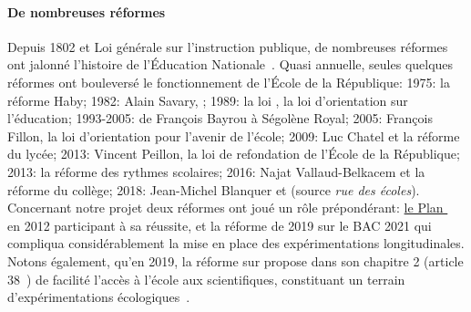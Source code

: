         \paragraph{De nombreuses réformes}
            Depuis 1802 et Loi générale sur l'instruction publique, de nombreuses réformes ont jalonné l'histoire de l'Éducation Nationale~. Quasi annuelle, seules quelques réformes ont bouleversé le fonctionnement de l'École de la République: 
            1975: la réforme Haby;
            1982: Alain Savary, ;
            1989: la loi , la loi d'orientation sur l'éducation;
            1993-2005: de François Bayrou à Ségolène Royal;
            2005: François Fillon, la loi d'orientation pour l'avenir de l'école;
            2009: Luc Chatel et la réforme du lycée;
            2013: Vincent Peillon, la loi de refondation de l'École de la République;
            2013: la réforme des rythmes scolaires;
            2016: Najat Vallaud-Belkacem et la réforme du collège;
            2018: Jean-Michel Blanquer et 
            (source \textit{rue des écoles}).%
            Concernant notre projet deux réformes ont joué un rôle prépondérant: \href{http://www.Éducation.gouv.fr/pid285/bulletin_officiel.html?cid_bo=100720}{le Plan }~ en 2012 participant à sa réussite, et la réforme de 2019 sur le BAC 2021 qui compliqua considérablement la mise en place des expérimentations longitudinales. Notons également, qu'en 2019, la réforme sur  propose dans son chapitre 2 (article 38~) de facilité l'accès à l'école aux scientifiques, constituant un terrain d'expérimentations écologiques~.
